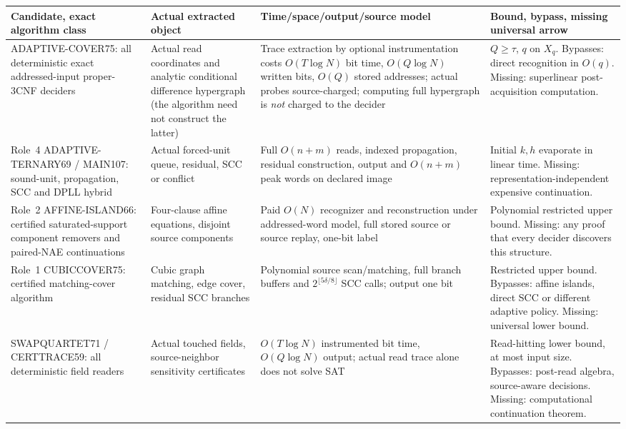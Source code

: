 \documentclass[11pt]{article}
\begin{document}
\footnotesize
\renewcommand{\arraystretch}{1.2}
\begin{longtable}{p{.15\linewidth}p{.175\linewidth}p{.255\linewidth}p{.25\linewidth}}
\toprule
Candidate, exact algorithm class & Actual extracted object &
Time/space/output/source model & Bound, bypass, missing universal arrow\\\midrule
\endhead
ADAPTIVE-COVER75: all deterministic exact addressed-input
proper-3CNF deciders &
Actual read coordinates and analytic conditional difference
hypergraph (the algorithm need not construct the latter) &
Trace extraction by optional instrumentation costs $O(T\log N)$
bit time, $O(Q\log N)$ written bits, $O(Q)$ stored addresses;
actual probes source-charged; computing full hypergraph is
\emph{not} charged to the decider &
$Q\ge\tau$, $q$ on $X_q$. Bypasses: direct recognition in $O(q)$.
Missing: superlinear post-acquisition computation.\\\midrule
Role~4 ADAPTIVE-TERNARY69 / MAIN107:
sound-unit, propagation, SCC and DPLL hybrid &
Actual forced-unit queue, residual, SCC or conflict &
Full $O(n+m)$ reads, indexed propagation, residual construction,
output and $O(n+m)$ peak words on declared image &
Initial $k,h$ evaporate in linear time. Missing:
representation-independent expensive continuation.\\\midrule
Role~2 AFFINE-ISLAND66: certified saturated-support component
removers and paired-NAE continuations &
Four-clause affine equations, disjoint source components &
Paid $O(N)$ recognizer and reconstruction under addressed-word
model, full stored source or source replay, one-bit label &
Polynomial restricted upper bound. Missing:
any proof that every decider discovers this structure.\\\midrule
Role~1 CUBICCOVER75: certified matching-cover algorithm &
Cubic graph matching, edge cover, residual SCC branches &
Polynomial source scan/matching, full branch buffers and
$2^{\lfloor5\delta/8\rfloor}$ SCC calls; output one bit &
Restricted upper bound. Bypasses: affine islands, direct SCC
or different adaptive policy. Missing: universal lower bound.\\\midrule
SWAPQUARTET71 / CERTTRACE59: all deterministic field readers &
Actual touched fields, source-neighbor sensitivity certificates &
$O(T\log N)$ instrumented bit time,
$O(Q\log N)$ output; actual read trace alone does not solve SAT &
Read-hitting lower bound, at most input size.
Bypasses: post-read algebra, source-aware decisions.
Missing: computational continuation theorem.\\\midrule

\end{longtable}
\end{document}
